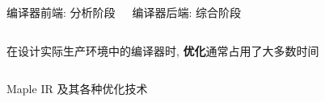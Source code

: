 \begin{frame}{}
  \begin{columns}
      \begin{center}
        编译器前端: 分析阶段

      \end{center}
      \begin{center}
        编译器后端: 综合阶段

      \end{center}
  \end{columns}
\end{frame}

\begin{frame}{}
  \begin{center}
  \end{center}

  \begin{columns}
  \end{columns}

  \vspace{0.30cm}
  \begin{center}
    在设计实际生产环境中的编译器时, {\bf 优化}通常占用了大多数时间
  \end{center}
\end{frame}

\begin{frame}{}
  \begin{columns}
  \end{columns}

  \vspace{0.50cm}
  \begin{center}
    Maple IR 及其各种优化技术
  \end{center}
\end{frame}

